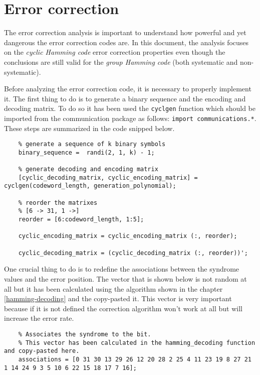 \vspace{40px} \section{Error correction} \label{ciclic-coding}
The error correction analysis is important to understand how powerful and yet dangerous the error correction codes are. In this document, the analysis focuses on the \textsl{cyclic Hamming code} error correction properties even though the conclusions are still valid for the \textsl{group Hamming code} (both systematic and non-systematic). 

Before analyzing the error correction code, it is necessary to properly implement it. The first thing to do is to generate a binary sequence and the encoding and decoding matrix. To do so it has been used the \texttt{cyclgen} function which should be imported from the communication package as follows: \texttt{import communications.*}. These steps are summarized in the code snipped below.

\begin{lstlisting} 
    % generate a sequence of k binary symbols
    binary_sequence =  randi(2, 1, k) - 1;

    % generate decoding and encoding matrix
    [cyclic_decoding_matrix, cyclic_encoding_matrix] = cyclgen(codeword_length, generation_polynomial);

    % reorder the matrixes
    % [6 -> 31, 1 ->]
    reorder = [6:codeword_length, 1:5];

    cyclic_encoding_matrix = cyclic_encoding_matrix (:, reorder); 

    cyclic_decoding_matrix = (cyclic_decoding_matrix (:, reorder))'; 
\end{lstlisting}

\noindent One crucial thing to do is to redefine the associations between the syndrome values and the error position. The vector that is shown below is not random at all but it has been calculated using the algorithm shown in the chapter \ref{hamming-decoding} and the copy-pasted it. This vector is very important because if it is not defined the correction algorithm won't work at all but will increase the error rate.

\begin{lstlisting} 
    % Associates the syndrome to the bit.
    % This vector has been calculated in the hamming_decoding function and copy-pasted here.
    associations = [0 31 30 13 29 26 12 20 28 2 25 4 11 23 19 8 27 21 1 14 24 9 3 5 10 6 22 15 18 17 7 16];
\end{lstlisting} 

